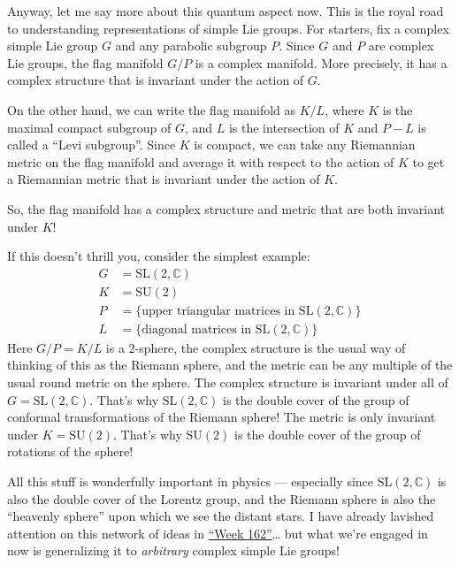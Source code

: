 \documentclass{article}
\begin{document}
Anyway, let me say more about this quantum aspect now. This is the royal
road to understanding representations of simple Lie groups. For
starters, fix a complex simple Lie group \(G\) and any parabolic
subgroup \(P\). Since \(G\) and \(P\) are complex Lie groups, the flag
manifold \(G/P\) is a complex manifold. More precisely, it has a complex
structure that is invariant under the action of \(G\).

On the other hand, we can write the flag manifold as \(K/L\), where
\(K\) is the maximal compact subgroup of \(G\), and \(L\) is the
intersection of \(K\) and \(P - L\) is called a ``Levi subgroup''. Since
\(K\) is compact, we can take any Riemannian metric on the flag manifold
and average it with respect to the action of \(K\) to get a Riemannian
metric that is invariant under the action of \(K\).

So, the flag manifold has a complex structure and metric that are both
invariant under \(K\)!

If this doesn't thrill you, consider the simplest example: \[
  \begin{aligned}
    G &= \mathrm{SL}(2,\mathbb{C})
  \\K &= \mathrm{SU}(2)
  \\P &= \{\mbox{upper triangular matrices in $\mathrm{SL}(2,\mathbb{C})$}\}
  \\L &= \{\mbox{diagonal matrices in $\mathrm{SL}(2,\mathbb{C})$}\}
  \end{aligned}
\] Here \(G/P = K/L\) is a \(2\)-sphere, the complex structure is the
usual way of thinking of this as the Riemann sphere, and the metric can
be any multiple of the usual round metric on the sphere. The complex
structure is invariant under all of \(G = \mathrm{SL}(2,\mathbb{C})\).
That's why \(\mathrm{SL}(2,\mathbb{C})\) is the double cover of the
group of conformal transformations of the Riemann sphere! The metric is
only invariant under \(K = \mathrm{SU}(2)\). That's why
\(\mathrm{SU}(2)\) is the double cover of the group of rotations of the
sphere!

All this stuff is wonderfully important in physics --- especially since
\(\mathrm{SL}(2,\mathbb{C})\) is also the double cover of the Lorentz
group, and the Riemann sphere is also the ``heavenly sphere'' upon which
we see the distant stars. I have already lavished attention on this
network of ideas in \protect\hyperlink{week162}{``Week 162''}\ldots{}
but what we're engaged in now is generalizing it to \emph{arbitrary}
complex simple Lie groups!
\end{document}
